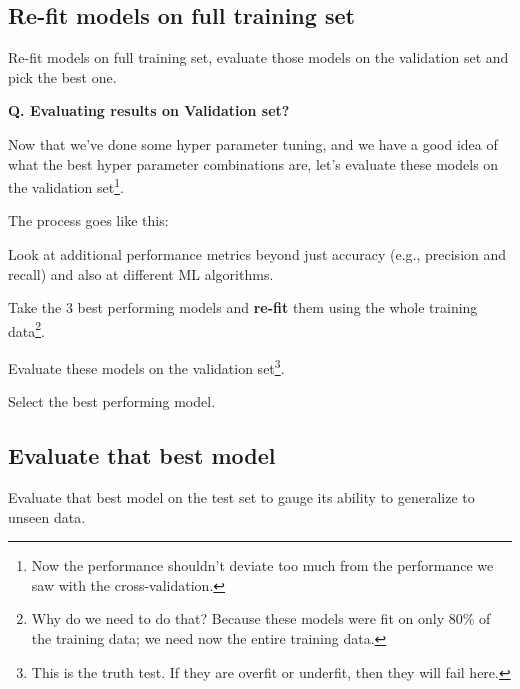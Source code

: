 \subsection{Re-fit models on full training set}
\begin{transitionsubframe}
  \begin{center}
    \Huge Re-fit models on full training set, evaluate those models
    on the validation set and pick the best one.
  \end{center}
\end{transitionsubframe}

\begin{frame}{\textbf{Q. Evaluating results on Validation set?}}
  \begin{wideitemize}\small
    \item Now that we've done some hyper parameter tuning, and we have a good idea
    of what the best hyper parameter combinations are, let's evaluate these models on
    the validation set\footnote{Now the performance shouldn't deviate too much from
    the performance we saw with the cross-validation.}.
    \item The process goes like this:
    \begin{wideitemize}
      \item[1] Look at additional performance metrics beyond just accuracy
      (e.g., precision and recall) and also at different ML algorithms.
      \item[2] Take the $3$ best performing models and \textbf{re-fit} them
      using the whole training data\footnote{Why do we need to do that? Because
      these models were fit on only $80$\% of the training data; we need now the entire training data.}.
      \item[3] Evaluate these models on the validation set\footnote{This is the truth test.
      If they are overfit or underfit, then they will fail here.}.
      \item[4] Select the best performing model.
    \end{wideitemize}
  \end{wideitemize}
\end{frame}

\subsection{Evaluate that best model}
\begin{transitionsubframe}
  \begin{center}
    \Huge Evaluate that best model on the test set to gauge its ability
    to generalize to unseen data.
  \end{center}
\end{transitionsubframe}

